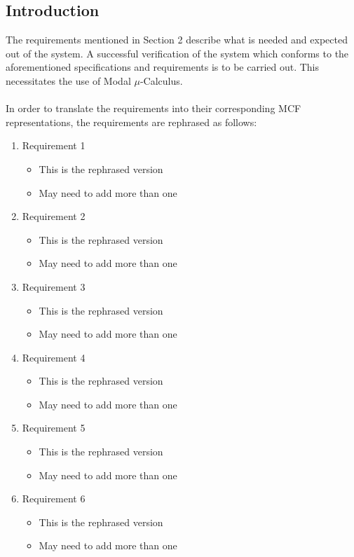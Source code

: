 \documentclass[a4paper,12pt]{article}
\begin{document}
\subsection{Introduction}
The requirements mentioned in Section 2 describe what is needed and expected out of the system. A successful verification of the system which conforms to the aforementioned specifications and requirements is to be carried out. This necessitates the use of Modal $\mu$-Calculus.   
\\
\\In order to translate the requirements into their corresponding MCF representations, the requirements are rephrased as follows:
\begin{enumerate}
\item Requirement 1
	\begin{itemize}
	\item This is the rephrased version
	\item May need to add more than one 
	\end{itemize}
\item Requirement 2
	\begin{itemize}
	\item This is the rephrased version
	\item May need to add more than one 
	\end{itemize}
\item Requirement 3
	\begin{itemize}
	\item This is the rephrased version
	\item May need to add more than one 
	\end{itemize}
\item Requirement 4
	\begin{itemize}
	\item This is the rephrased version
	\item May need to add more than one 
	\end{itemize}
\item Requirement 5
	\begin{itemize}
	\item This is the rephrased version
	\item May need to add more than one 
	\end{itemize}
\item Requirement 6
	\begin{itemize}
	\item This is the rephrased version
	\item May need to add more than one 

\end{itemize}
\end{enumerate}
\end{document}
